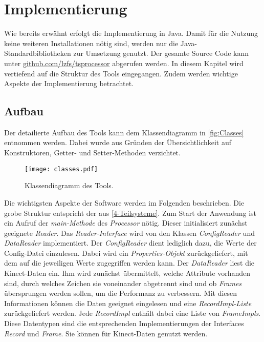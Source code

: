\chapter{Implementierung}
\label{chapter5}
Wie bereits erwähnt erfolgt die Implementierung in Java.
Damit für die Nutzung keine weiteren Installationen nötig sind,
werden nur die Java-Standardbibliotheken zur Umsetzung genutzt.
Der gesamte Source Code kann unter \href{https://github.com/lzfs/tsprocessor}{github.com/lzfs/tsprocessor}
abgerufen werden.
In diesem Kapitel wird vertiefend auf die Struktur des Tools eingegangen.
Zudem werden wichtige Aspekte der Implementierung betrachtet.

\section{Aufbau}
\label{5-Aufbau}
Der detailierte Aufbau des Tools kann dem Klassendiagramm in \autoref{fig:Classes} entnommen werden.
Dabei wurde aus Gründen der Übersichtlichkeit auf Konstruktoren,
Getter- und Setter-Methoden verzichtet.
\begin{figure}[p]
    \begin{center}
        \texttt{[image: classes.pdf]}
    \end{center}
    \caption{Klassendiagramm des Tools.}
    \label{fig:Classes}
\end{figure}
Die wichtigsten Aspekte der Software werden im Folgenden beschrieben.
Die grobe Struktur entspricht der aus \autoref{4-Teilsysteme}.
Zum Start der Anwendung ist ein Aufruf der \emph{main-Methode} des \emph{Processor} nötig.
Dieser initialisiert zunächst geeignete \emph{Reader}.
Das \emph{Reader-Interface} wird von den Klassen \emph{ConfigReader} und \emph{DataReader} implementiert.
Der \emph{ConfigReader} dient lediglich dazu, die Werte der Config-Datei einzulesen.
Dabei wird ein \emph{Properties-Objekt} zurückgeliefert,
mit dem auf die jeweiligen Werte zugegriffen werden kann.
Der \emph{DataReader} liest die Kinect-Daten ein.
Ihm wird zunächst übermittelt, welche Attribute vorhanden sind,
durch welches Zeichen sie voneinander abgetrennt sind
und ob \emph{Frames} übersprungen werden sollen,
um die Performanz zu verbessern.
Mit diesen Informationen können die Daten geeignet eingelesen und eine \emph{RecordImpl-Liste} zurückgeliefert werden.
Jede \emph{RecordImpl} enthält dabei eine Liste von \emph{FrameImpls}.
Diese Datentypen sind die entsprechenden Implementierungen der Interfaces \emph{Record} und \emph{Frame}.
Sie können für Kinect-Daten genutzt werden.

